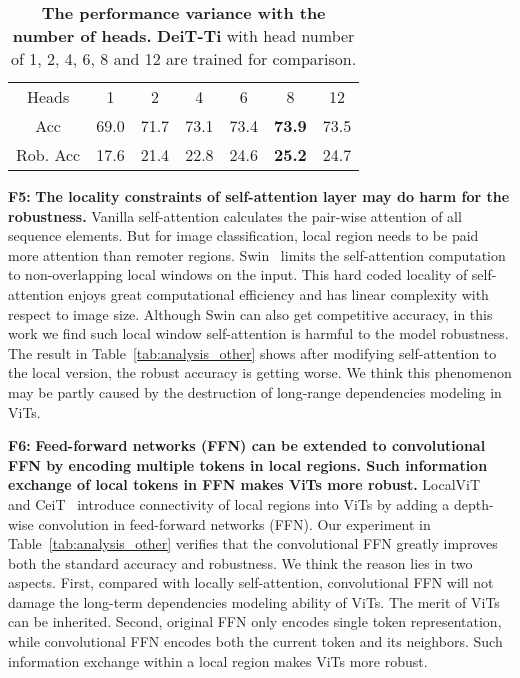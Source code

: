 \documentclass[10pt,twocolumn,letterpaper]{article}
\newcommand{\tablestyle}[2]{\setlength{\tabcolsep}{#1}\renewcommand{\arraystretch}{#2}\centering\footnotesize}
\begin{document}
\begin{table}[h]
	\centering
	\small
		\tablestyle{5pt}{1.05}
		\begin{tabular}{c|c|c|c|c|c|c}
		\shline
			Heads & 1 & 2 & 4 & 6 & 8 & 12 \\
			\shline
			Acc & 69.0 & 71.7 & 73.1 & 73.4 & \textbf{73.9} & 73.5  \\ 
			Rob. Acc & 17.6 & 21.4 & 22.8 &  24.6 & \textbf{25.2} & 24.7 \\ 
	\end{tabular}
	\caption{\textbf{The performance variance with the number of heads.} \textbf{DeiT-Ti} with head number of 1, 2, 4, 6, 8 and 12 are trained for comparison. 
	\label{analysis:head} }
		\vspace{-10pt}
\end{table}

\textbf{F5: }\textbf{The locality constraints of self-attention layer may do harm for the robustness. } Vanilla self-attention calculates the pair-wise attention of all sequence elements. But for image classification, local region needs to be paid more attention than remoter regions. Swin~\cite{liu2021swin} limits the self-attention computation to non-overlapping local windows on the input. This hard coded locality of self-attention enjoys great computational efficiency and has linear complexity with respect to image size. Although Swin can also get competitive accuracy, in this work we find such local window self-attention is harmful to the model robustness. The result in Table~\ref{tab:analysis_other} shows after modifying self-attention to the local version, the robust accuracy is getting worse. We think this phenomenon may be partly caused by the destruction of long-range dependencies modeling in ViTs.

\textbf{F6: }\textbf{Feed-forward networks (FFN) can be extended to convolutional FFN by encoding multiple tokens in local regions. Such information exchange of local tokens in FFN makes ViTs more robust. } LocalViT~\cite{li2021localvit} and CeiT~\cite{yuan2021incorporating} introduce connectivity of local regions into ViTs by adding a depth-wise convolution in feed-forward networks (FFN). Our experiment in Table~\ref{tab:analysis_other} verifies that the convolutional FFN greatly improves both the standard accuracy and robustness. We think the reason lies in two aspects. First, compared with locally self-attention, convolutional FFN will not damage the long-term dependencies modeling ability of ViTs. The merit of ViTs can be inherited. Second, original FFN only encodes single token representation, while convolutional FFN encodes both the current token and its neighbors. Such information exchange within a local region makes ViTs more robust.
\end{document}
